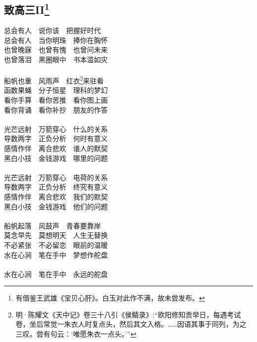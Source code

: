 \documentclass[a5paper]{ctexart}
\begin{document}
	\subsection[致高三II]{致高三II\footnote{有借鉴王武雄《宝贝心肝》。白玉对此作不满，故未尝发布。}}
	\begin{center}
		总会有人\ \ 说你该\ \ 把握好时代\\
		总会有人\ \ 当你明珠\ \ 捧你在胸怀\\
		也曾晚寐\  \ 也曾有愧\ \ 也曾问未来\\
		也曾落泪\ \ 黑圈眼中\ \ 书本滥如灾\\ \hspace*{\fill} \\
		
		船帆也重\ \ 风雨声\ \ 红衣\footnote{明·陈耀文《天中记》卷三十八引《侯鲭录》:“欧阳修知贡举日，每遇考试卷，坐后常觉一朱衣人时复点头，然后其文入格。……因语其事于同列，为之三叹。尝有句云：‘唯愿朱衣一点头。’”}来驻看\\
		函数果蝇\ \ 分子恒星\ \ 理科的梦幻\\
		看你手算\ \ 看你苦推\ \ 看你图上画\\
		看你背诵\ \ 看你补抄\ \ 朋友的作答\\ \hspace*{\fill} \\
		
		光芒远射\ \ 万箭穿心\ \ 什么的关系\\
		导数两字\ \ 正负分析\ \ 何时有意义\\
		感情作伴\ \ 离合悲欢\ \ 谁人的默契\\
		黑白小技\ \ 金钱游戏\ \ 哪里的问题\\ \hspace*{\fill} \\
		
		光芒远射\ \ 万箭穿心\ \ 电荷的关系\\
		导数两字\ \ 正负分析\ \ 终究有意义\\
		感情作伴\ \ 离合悲欢\ \ 我们的默契\\
		黑白小技\ \ 金钱游戏\ \ 他们的问题\\ \hspace*{\fill} \\
		
		船帆起落\ \ 风鼓声\ \ 青春要靠岸\\
		莫念早先\ \ 莫想明天\ \ 人生无替换\\
		不必紧张\ \ 不必留恋\ \ 眼前的温暖\\
		水在心涧\ \ 笔在手中\ \ 梦想作舵盘\\ \hspace*{\fill} \\
		
		水在心涧\ \  笔在手中\ \  永远的舵盘
	\end{center}
	
\end{document}
